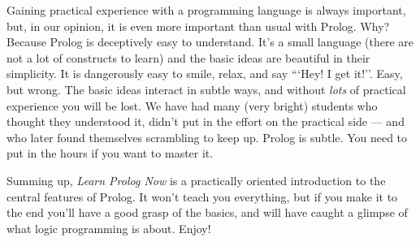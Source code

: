 Gaining practical experience with a programming language is always
important, but, in our opinion, it is even more important than usual
with Prolog. Why?  Because Prolog is deceptively easy to
understand. It's a small language (there are not a lot of constructs
to learn) and the basic ideas are beautiful in their simplicity. It is
dangerously easy to smile, relax, and say ```Hey! I get it!''.  Easy,
but wrong. The basic ideas interact in subtle ways, and without
\textit{lots} of practical experience you will be lost. We have had
many (very bright) students who thought they understood it, didn't put
in the effort on the practical side --- and who later found themselves
scrambling to keep up.  Prolog is subtle. You need to put in the hours
if you want to master it.

\medskip

Summing up, \textit{Learn Prolog Now} is a practically oriented
introduction to the central features of Prolog. It won't teach you
everything, but if you make it to the end you'll have a good grasp of
the basics, and will have caught a glimpse of what logic programming is
about. Enjoy!

